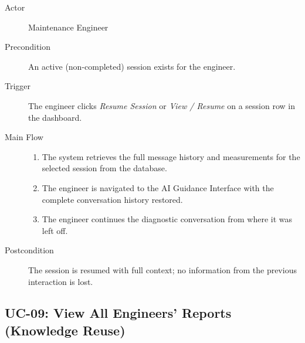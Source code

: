 \begin{description}
    \item[Actor] Maintenance Engineer
    \item[Precondition] An active (non-completed) session exists for the engineer.
    \item[Trigger] The engineer clicks \textit{Resume Session} or \textit{View / Resume}
                   on a session row in the dashboard.
    \item[Main Flow]
        \begin{enumerate}[noitemsep]
            \item The system retrieves the full message history and measurements
                  for the selected session from the database.
            \item The engineer is navigated to the AI Guidance Interface with the
                  complete conversation history restored.
            \item The engineer continues the diagnostic conversation from where it
                  was left off.
        \end{enumerate}
    \item[Postcondition]
        The session is resumed with full context; no information from the previous
        interaction is lost.
\end{description}

\subsection{UC-09: View All Engineers' Reports (Knowledge Reuse)\label{sec:uc09}}


